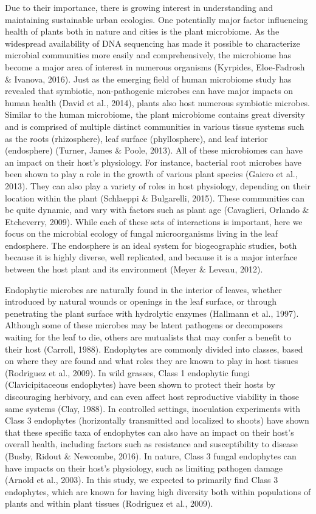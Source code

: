 \documentclass[fleqn,10pt,lineno]{wlpeerj} %
\begin{document}
Due to their importance, there is growing interest in understanding and maintaining sustainable urban ecologies. One potentially major factor influencing health of plants both in nature and cities is the plant microbiome. As the widespread availability of DNA sequencing has made it possible to characterize microbial communities more easily and comprehensively, the microbiome has become a major area of interest in numerous organisms (Kyrpides, Eloe-Fadrosh \& Ivanova, 2016). Just as the emerging field of human microbiome study has revealed that symbiotic, non-pathogenic microbes can have major impacts on human health (David et al., 2014), plants also host numerous symbiotic microbes. Similar to the human microbiome, the plant microbiome contains great diversity and is comprised of multiple distinct communities in various tissue systems such as the roots (rhizosphere), leaf surface (phyllosphere), and leaf interior (endosphere) (Turner, James \& Poole, 2013). All of these microbiomes can have an impact on their host's physiology. For instance, bacterial root microbes have been shown to play a role in the growth of various plant species (Gaiero et al., 2013). They can also play a variety of roles in host physiology, depending on their location within the plant (Schlaeppi \& Bulgarelli, 2015). These communities can be quite dynamic, and vary with factors such as plant age (Cavaglieri, Orlando \& Etcheverry, 2009). While each of these sets of interactions is important, here we focus on the microbial ecology of fungal microorganisms living in the leaf endosphere. The endosphere is an ideal system for biogeographic studies, both because it is highly diverse, well replicated, and because it is a major interface between the host plant and its environment (Meyer \& Leveau, 2012).

Endophytic microbes are naturally found in the interior of leaves, whether introduced by natural wounds or openings in the leaf surface, or through penetrating the plant surface with hydrolytic enzymes (Hallmann et al., 1997). Although some of these microbes may be latent pathogens or decomposers waiting for the leaf to die, others are mutualists that may confer a benefit to their host (Carroll, 1988). Endophytes are commonly divided into classes, based on where they are found and what roles they are known to play in host tissues (Rodriguez et al., 2009). In wild grasses, Class 1 endophytic fungi (Clavicipitaceous endophytes) have been shown to protect their hosts by discouraging herbivory, and can even affect host reproductive viability in those same systems (Clay, 1988). In controlled settings, inoculation experiments with Class 3 endophytes (horizontally transmitted and localized to shoots) have shown that these specific taxa of endophytes can also have an impact on their host's overall health, including factors such as resistance and susceptibility to disease (Busby, Ridout \& Newcombe, 2016). In nature, Class 3 fungal endophytes can have impacts on their host's physiology, such as limiting pathogen damage (Arnold et al., 2003). In this study, we expected to primarily find Class 3 endophytes, which are known for having high diversity both within populations of plants and within plant tissues (Rodriguez et al., 2009).
\end{document}
